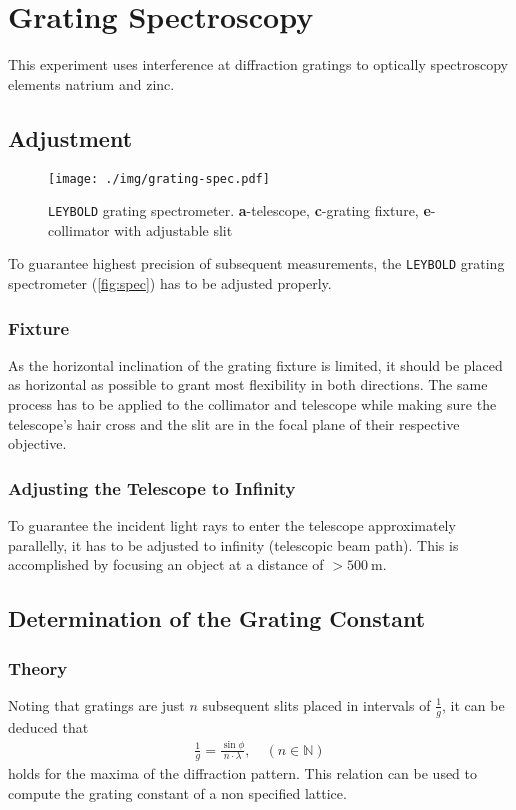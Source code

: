 \chapter{Grating Spectroscopy}
This experiment uses interference at diffraction gratings to optically spectroscopy elements natrium and zinc.

\section{Adjustment}
\begin{figure}
	\centering
	\texttt{[image: ./img/grating-spec.pdf]}
	\caption[\texttt{LEYBOLD} grating spectrometer]{\texttt{LEYBOLD} grating spectrometer. \textbf{a}-telescope, \textbf{c}-grating fixture, \textbf{e}-collimator with adjustable slit}
	\label{fig:spec}
\end{figure}
To guarantee highest precision of subsequent measurements, the \texttt{LEYBOLD} grating spectrometer (\autoref{fig:spec}) has to be adjusted properly.

\subsection{Fixture}
As the horizontal inclination of the grating fixture is limited, it should be placed as horizontal as possible to grant most flexibility in both directions.
The same process has to be applied to the collimator and telescope while making sure the telescope's hair cross and the slit are in the focal plane of their respective objective.

\subsection{Adjusting the Telescope to Infinity}
To guarantee the incident light rays to enter the telescope approximately parallelly, it has to be adjusted to infinity (telescopic beam path).
This is accomplished by focusing an object at a distance of $>\SI{500}{\meter}$.

\section{Determination of the Grating Constant}
\subsection{Theory}
Noting that gratings are just $n$ subsequent slits placed in intervals of $\frac{1}{g}$, it can be deduced that
\begin{align}
	\frac{1}{g}=\frac{\sin\phi}{n\cdot\lambda},\quad(n\in\mathbb{N}) \label{eq:grating-const}
\end{align}
holds for the maxima of the diffraction pattern.
This relation can be used to compute the grating constant of a non specified lattice.
